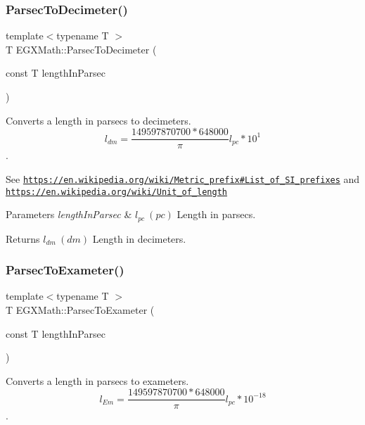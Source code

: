 \subsubsection{\texorpdfstring{Parsec\+To\+Decimeter()}{ParsecToDecimeter()}}
{\footnotesize\ttfamily template$<$typename T $>$ \\
T E\+G\+X\+Math\+::\+Parsec\+To\+Decimeter (\begin{DoxyParamCaption}\item[{const T}]{length\+In\+Parsec }\end{DoxyParamCaption})}



Converts a length in parsecs to decimeters. \[ l_{dm}=\frac{149597870700 * 648000}{\pi}l_{pc} * 10^{1} \]. 

See \href{https://en.wikipedia.org/wiki/Metric_prefix#List_of_SI_prefixes}{\tt https\+://en.\+wikipedia.\+org/wiki/\+Metric\+\_\+prefix\#\+List\+\_\+of\+\_\+\+S\+I\+\_\+prefixes} and \href{https://en.wikipedia.org/wiki/Unit_of_length}{\tt https\+://en.\+wikipedia.\+org/wiki/\+Unit\+\_\+of\+\_\+length} 
\begin{DoxyParams}{Parameters}
{\em length\+In\+Parsec} & $ l_{pc}\ (pc)$ Length in parsecs. \\
\hline
\end{DoxyParams}
\begin{DoxyReturn}{Returns}
$ l_{dm}\ (dm)$ Length in decimeters. 
\end{DoxyReturn}
\mbox{\label{group___e_g_x_math-_conversions-_length_conversions-_astronomical-_parsec-_s_i_ga598f46c20868c84cf76fd6f934620728}} 
\subsubsection{\texorpdfstring{Parsec\+To\+Exameter()}{ParsecToExameter()}}
{\footnotesize\ttfamily template$<$typename T $>$ \\
T E\+G\+X\+Math\+::\+Parsec\+To\+Exameter (\begin{DoxyParamCaption}\item[{const T}]{length\+In\+Parsec }\end{DoxyParamCaption})}



Converts a length in parsecs to exameters. \[ l_{Em}=\frac{149597870700 * 648000}{\pi}l_{pc} * 10^{-18} \]. 

